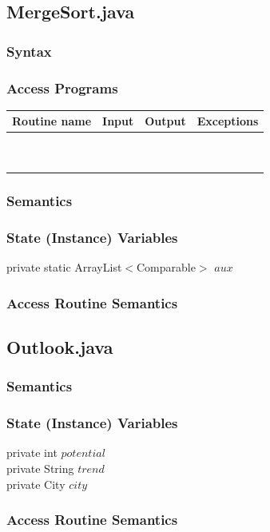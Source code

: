 \documentclass[12pt,fleqn]{article}
\begin{document}
\subsection*{MergeSort.java}\label{psort}
\subsubsection* {Syntax}

\subsubsection* {Access Programs}
\begin{tabular}{| l | l | l | l |}
\hline
\textbf{Routine name} & \textbf{Input} & \textbf{Output} & \textbf{Exceptions}\\
\hline
~ & ~ & ~ & ~\\
\hline
~ & ~ & ~ & ~\\
\hline
\end{tabular}

\subsubsection*{Semantics}
\subsubsection*{State (Instance) Variables}
	private static ArrayList$<$Comparable$>$ $aux$
\subsubsection*{Access Routine Semantics}


\subsection*{Outlook.java}\label{poutlook}

\subsubsection*{Semantics}
\subsubsection*{State (Instance) Variables}
	private int $potential$\\
	private String $trend$\\
	private City $city$
\subsubsection*{Access Routine Semantics}
\end{document}
